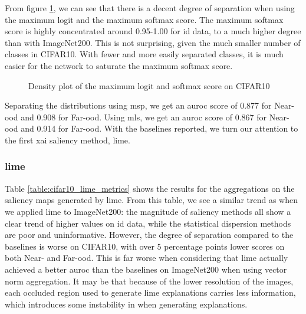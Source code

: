 \documentclass[UKenglish]{uiomasterthesis} %
\theoremstyle{definition}
\begin{document}
From figure \ref{fig:cifar10_logits_distribution}, we can see that there is a decent degree of separation when using the maximum logit and the maximum softmax score. The maximum softmax score is highly concentrated around 0.95-1.00 for \ac{id} data, to a much higher degree than with ImageNet200. This is not surprising, given the much smaller number of classes in CIFAR10. With fewer and more easily separated classes, it is much easier for the network to saturate the maximum softmax score.

\begin{figure}[H]
    \begin{center}
        
    \end{center}
    \caption[CIFAR10 maximum logit and softmax score distribution]{Density plot of the maximum logit and softmax score on CIFAR10}
    \label{fig:cifar10_logits_distribution}
\end{figure}

Separating the distributions using \ac{msp}, we get an \ac{auroc} score of 0.877 for Near-\ac{ood} and 0.908 for Far-\ac{ood}. Using \ac{mls}, we get an \ac{auroc} score of 0.867 for Near-\ac{ood} and 0.914 for Far-\ac{ood}. With the baselines reported, we turn our attention to the first \ac{xai} saliency method, \ac{lime}.

\subsubsection{\ac{lime}}

Table \ref{table:cifar10_lime_metrics} shows the results for the aggregations on the saliency maps generated by \ac{lime}. From this table, we see a similar trend as when we applied \ac{lime} to ImageNet200: the magnitude of saliency methods all show a clear trend of higher values on \ac{id} data, while the statistical dispersion methods are poor and uninformative. However, the degree of separation compared to the baselines is worse on CIFAR10, with over 5 percentage points lower scores on both Near- and Far-\ac{ood}. This is far worse when considering that \ac{lime} actually achieved a better \ac{auroc} than the baselines on ImageNet200 when using vector norm aggregation. It may be that because of the lower resolution of the images, each occluded region used to generate \ac{lime} explanations carries less information, which introduces some instability in when generating explanations.
\end{document}
